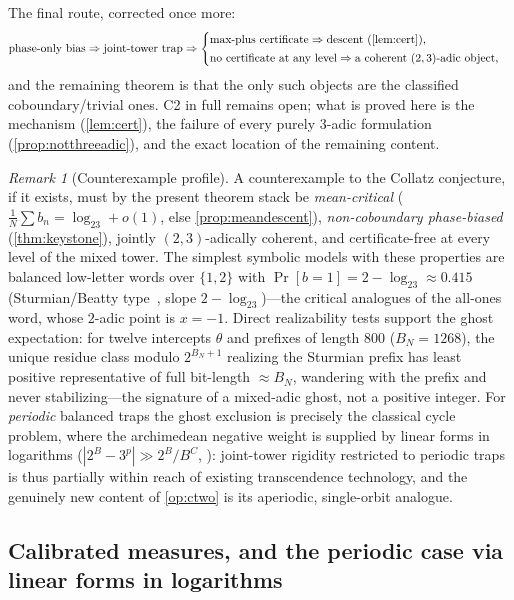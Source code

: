 \documentclass[11pt]{article}
\theoremstyle{plain}
\theoremstyle{definition}
\theoremstyle{remark}
\newtheorem*{remark}{Remark}
\begin{document}
\noindent The final route, corrected once more:
\[
\text{phase-only bias}
\Rightarrow
\text{joint-tower trap}
\Rightarrow
\begin{cases}
\text{max-plus certificate}\Rightarrow\text{descent (\cref{lem:cert}),}\\[2pt]
\text{no certificate at any level}\Rightarrow\text{a coherent
$(2,3)$-adic object,}
\end{cases}
\]
and the remaining theorem is that the only such objects are the
classified coboundary/trivial ones. C2 in full remains open; what is
proved here is the mechanism (\cref{lem:cert}), the failure of every
purely $3$-adic formulation (\cref{prop:notthreeadic}), and the exact
location of the remaining content.

\begin{remark}[Counterexample profile]\label{rem:profile}
A counterexample to the Collatz conjecture, if it exists, must by the
present theorem stack be \emph{mean-critical}
($\frac1N\sum b_n=\log_23+o(1)$, else \cref{prop:meandescent}),
\emph{non-coboundary phase-biased} (\cref{thm:keystone}), jointly
$(2,3)$-adically coherent, and certificate-free at every level of the
mixed tower. The simplest symbolic models with these properties are
balanced low-letter words over $\{1,2\}$ with
$\Pr[b{=}1]=2-\log_23\approx0.415$ (Sturmian/Beatty
type~\cite{morsehedlund1940,lothaire2002}, slope
$2-\log_23$)---the critical analogues of the all-ones word, whose
$2$-adic point is $x=-1$. Direct realizability tests support the ghost
expectation: for twelve intercepts $\theta$ and prefixes of length
$800$ ($B_N=1268$), the unique residue class modulo $2^{B_N+1}$
realizing the Sturmian prefix has least positive representative of full
bit-length $\approx B_N$, wandering with the prefix and never
stabilizing---the signature of a mixed-adic ghost, not a positive
integer. For \emph{periodic} balanced traps the ghost exclusion is
precisely the classical cycle problem, where the archimedean negative
weight is supplied by linear forms in logarithms
($|2^B-3^p|\gg2^B/B^{C}$, \cite{baker1975,rhin1987}): joint-tower rigidity restricted to periodic
traps is thus partially within reach of existing transcendence
technology, and the genuinely new content of \cref{op:ctwo} is its
aperiodic, single-orbit analogue.
\end{remark}

\subsection*{Calibrated measures, and the periodic case via linear forms
in logarithms}
\end{document}
